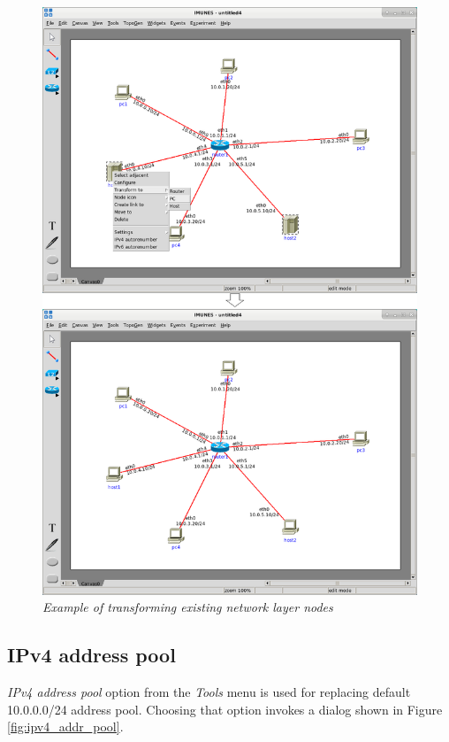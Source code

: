 \begin{figure}[H]
\centering
\vspace{10pt}
\includegraphics[width=\textwidth]{./images/transform.png}
\caption{\emph{Example of transforming existing network layer nodes}}
\label{fig:transform}
\end{figure}

\subsection{IPv4 address pool}
\label{sec:IPv4AddressPool}
\emph{IPv4 address pool} option from the \emph{Tools} menu is used for
replacing default 10.0.0.0/24 address pool. Choosing that option invokes a
dialog shown in Figure \ref{fig:ipv4_addr_pool}.


